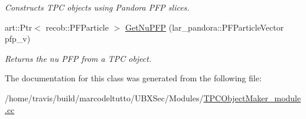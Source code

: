 \begin{DoxyCompactItemize}
\begin{DoxyCompactList}\small\item\em Constructs T\-P\-C objects using Pandora P\-F\-P slices. \end{DoxyCompactList}\item 
art\-::\-Ptr$<$ recob\-::\-P\-F\-Particle $>$ \hyperlink{group__UBXSec_ga6a47470b5f5690a3626e14bc9f6f360c}{Get\-Nu\-P\-F\-P} (lar\-\_\-pandora\-::\-P\-F\-Particle\-Vector pfp\-\_\-v)
\begin{DoxyCompactList}\small\item\em Returns the nu P\-F\-P from a T\-P\-C object. \end{DoxyCompactList}\end{DoxyCompactItemize}


The documentation for this class was generated from the following file\-:\begin{DoxyCompactItemize}
\item 
/home/travis/build/marcodeltutto/\-U\-B\-X\-Sec/\-Modules/\hyperlink{TPCObjectMaker__module_8cc}{T\-P\-C\-Object\-Maker\-\_\-module.\-cc}\end{DoxyCompactItemize}
